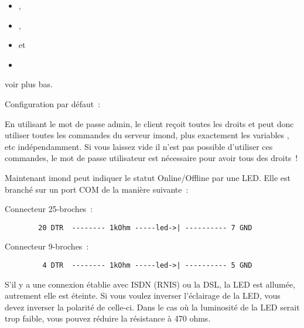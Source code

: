 \begin{description}
{      \begin{itemize}
      \item {},
      \item {},
      \item {} et
      \item {}
      \end{itemize}

      voir plus bas.
    }


    Configuration par défaut~: 

    {En utilisant le mot de passe admin, le client reçoit toutes les
    droits et peut donc utiliser toutes les commandes du serveur imond,
    plus exactement les variables , 
    etc indépendamment. Si vous laissez  vide il
    n'est pas possible d'utiliser ces commandes, le mot de passe utilisateur
    est nécessaire pour avoir tous des droits~!
    }


    {Maintenant imond peut indiquer le statut Online/Offline par une LED.
    Elle est branché sur un port COM de la manière suivante~:

      Connecteur 25-broches~:

\begin{example}
\begin{verbatim}
        20 DTR  -------- 1kOhm -----led->| ---------- 7 GND
\end{verbatim}
\end{example}

      Connecteur 9-broches~:

\begin{example}
\begin{verbatim}
         4 DTR  -------- 1kOhm -----led->| ---------- 5 GND
\end{verbatim}
\end{example}

      S'il y a une connexion établie avec ISDN (RNIS) ou la DSL, la LED
      est allumée, autrement elle est éteinte. Si vous voulez inverser
      l'éclairage de la LED, vous devez inverser la polarité de celle-ci.
      Dans le cas où la luminosité de la LED serait trop faible, vous pouvez
      réduire la résistance à 470 ohms.

}
\end{description}
